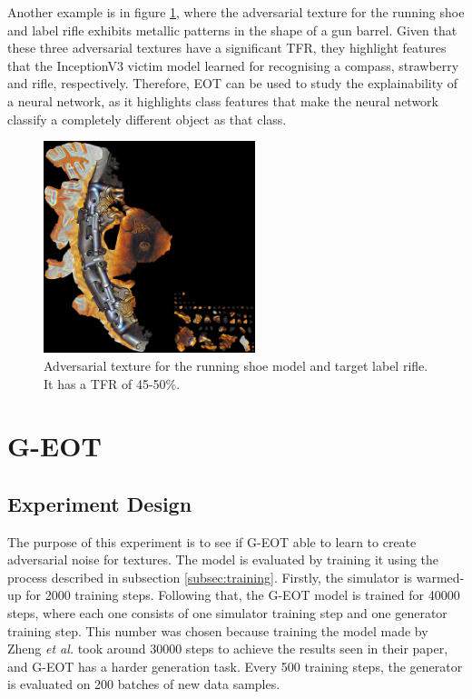 Another example is in figure \ref{fig:running_shoe_rifle}, where the adversarial texture for the running shoe and label rifle exhibits metallic patterns in the shape of a gun barrel. Given that these three adversarial textures have a significant TFR, they highlight features that the InceptionV3 victim model learned for recognising a compass, strawberry and rifle, respectively. Therefore, EOT can be used to study the explainability of a neural network, as it highlights class features that make the neural network classify a completely different object as that class.

\begin{figure}[H]
    \centering
    \includegraphics[width=0.55\textwidth]{graphics/running shoe rifle.jpg}
    \caption{Adversarial texture for the running shoe model and target label rifle. It has a TFR of 45-50\%.}
    \label{fig:running_shoe_rifle}
\end{figure}

\section{G-EOT}

\subsection{Experiment Design}

The purpose of this experiment is to see if G-EOT able to learn to create adversarial noise for textures. The model is evaluated by training it using the process described in subsection \ref{subsec:training}. Firstly, the simulator is warmed-up for 2000 training steps. Following that, the G-EOT model is trained for 40000 steps, where each one consists of one simulator training step and one generator training step. This number was chosen because training the model made by Zheng \textit{et al.} \cite{zheng_black_box_GAN} took around 30000 steps to achieve the results seen in their paper, and G-EOT has a harder generation task. Every 500 training steps, the generator is evaluated on 200 batches of new data samples.

